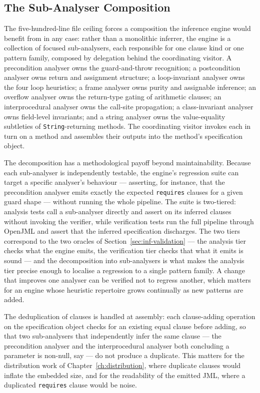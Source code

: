 \subsection{The Sub-Analyser Composition}

The five-hundred-line file ceiling forces a composition the inference engine
would benefit from in any case: rather than a monolithic inferrer, the engine is
a collection of focused sub-analysers, each responsible for one clause kind or
one pattern family, composed by delegation behind the coordinating visitor. A
precondition analyser owns the guard-and-throw recognition; a postcondition
analyser owns return and assignment structure; a loop-invariant analyser owns the
four loop heuristics; a frame analyser owns purity and assignable inference; an
overflow analyser owns the return-type gating of arithmetic clauses; an
interprocedural analyser owns the call-site propagation; a class-invariant
analyser owns field-level invariants; and a string analyser owns the
value-equality subtleties of \texttt{String}-returning methods. The coordinating
visitor invokes each in turn on a method and assembles their outputs into the
method's specification object.

The decomposition has a methodological payoff beyond maintainability. Because each
sub-analyser is independently testable, the engine's regression suite can target a
specific analyser's behaviour --- asserting, for instance, that the precondition
analyser emits exactly the expected \texttt{requires} clauses for a given guard
shape --- without running the whole pipeline. The suite is two-tiered: analysis
tests call a sub-analyser directly and assert on its inferred clauses without
invoking the verifier, while verification tests run the full pipeline through
OpenJML and assert that the inferred specification discharges. The two tiers
correspond to the two oracles of Section~\ref{sec:inf-validation} --- the analysis
tier checks what the engine emits, the verification tier checks that what it emits
is sound --- and the decomposition into sub-analysers is what makes the analysis
tier precise enough to localise a regression to a single pattern family. A change
that improves one analyser can be verified not to regress another, which matters
for an engine whose heuristic repertoire grows continually as new patterns are
added.

The deduplication of clauses is handled at assembly: each clause-adding operation
on the specification object checks for an existing equal clause before adding, so
that two sub-analysers that independently infer the same clause --- the
precondition analyser and the interprocedural analyser both concluding a parameter
is non-null, say --- do not produce a duplicate. This matters for the distribution
work of Chapter~\ref{ch:distribution}, where duplicate clauses would inflate the
embedded size, and for the readability of the emitted JML, where a duplicated
\texttt{requires} clause would be noise.

